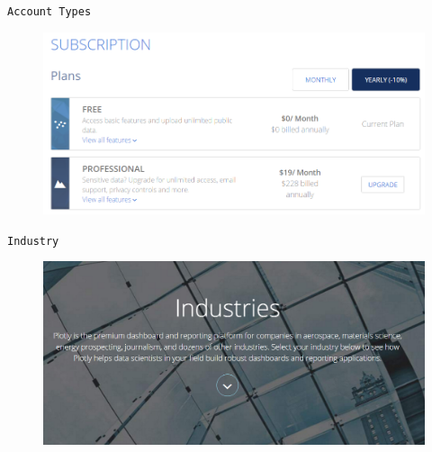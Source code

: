 \begin{frame}
	\large
	\texttt{Account Types}
	\begin{figure}
		\centering
		\includegraphics[width=01.1\linewidth]{plotlysubscription}
	\end{figure}
	
\end{frame}
\begin{frame}
	\large
	\texttt{Industry}
	\begin{figure}
		\centering
		\includegraphics[width=01.1\linewidth]{plotlyindustry}
	\end{figure}
	
\end{frame}


